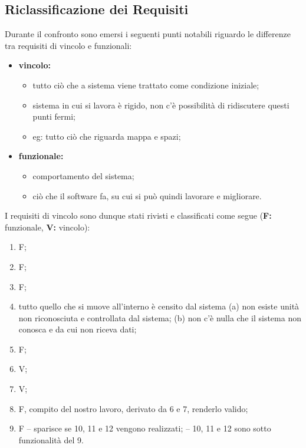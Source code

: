 \subsection{Riclassificazione dei Requisiti}
\label{req}
    Durante il confronto sono emersi i seguenti punti notabili riguardo le differenze tra requisiti di vincolo e funzionali:
    \begin{itemize}
        \item \textbf{vincolo: }
            \begin{itemize}
                \item tutto ciò che a sistema viene trattato come condizione iniziale;
                \item sistema in cui si lavora è rigido, non c'è possibilità di ridiscutere questi punti fermi;
                \item eg: tutto ciò che riguarda mappa e spazi;
            \end{itemize}
        \item \textbf{funzionale: }
            \begin{itemize}
                \item comportamento del sistema;
                \item ciò che il software fa, su cui si può quindi lavorare e migliorare.
            \end{itemize}
    \end{itemize}
    I requisiti di vincolo sono dunque stati rivisti e classificati come segue (\textbf{F: }funzionale, \textbf{V: }vincolo):
    \begin{enumerate}
        \item F;
        \item F;
        \item F;
        \item tutto quello che si muove all'interno è censito dal sistema
            \subitem (a) \; non esiste unità non riconosciuta e controllata dal sistema;
            \subitem (b) \; non c'è nulla che il sistema non conosca e da cui non riceva dati;
        \item F;
        \item V;
        \item V;
        \item F, compito del nostro lavoro, derivato da 6 e 7, renderlo valido;
        \item F
            \subitem -- sparisce se 10, 11 e 12 vengono realizzati;
            \subitem -- 10, 11 e 12 sono sotto funzionalità del 9.

    \end{enumerate}

